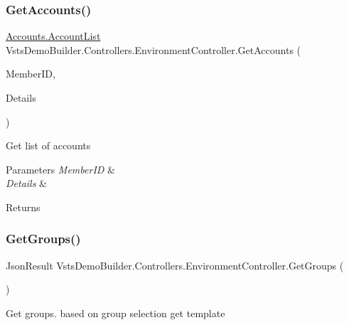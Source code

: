 \subsubsection{\texorpdfstring{Get\+Accounts()}{GetAccounts()}}
{\footnotesize\ttfamily \mbox{\hyperlink{class_vsts_demo_builder_1_1_models_1_1_accounts_1_1_account_list}{Accounts.\+Account\+List}} Vsts\+Demo\+Builder.\+Controllers.\+Environment\+Controller.\+Get\+Accounts (\begin{DoxyParamCaption}\item[{string}]{Member\+ID,  }\item[{\mbox{\hyperlink{class_vsts_demo_builder_1_1_models_1_1_access_details}{Access\+Details}}}]{Details }\end{DoxyParamCaption})}



Get list of accounts 


\begin{DoxyParams}{Parameters}
{\em Member\+ID} & \\
\hline
{\em Details} & \\
\hline
\end{DoxyParams}
\begin{DoxyReturn}{Returns}

\end{DoxyReturn}
\mbox{\label{class_vsts_demo_builder_1_1_controllers_1_1_environment_controller_a3b9b20acff06038e1aed58b3bfaaebd4}} 
\subsubsection{\texorpdfstring{Get\+Groups()}{GetGroups()}}
{\footnotesize\ttfamily Json\+Result Vsts\+Demo\+Builder.\+Controllers.\+Environment\+Controller.\+Get\+Groups (\begin{DoxyParamCaption}{ }\end{DoxyParamCaption})}



Get groups. based on group selection get template 


